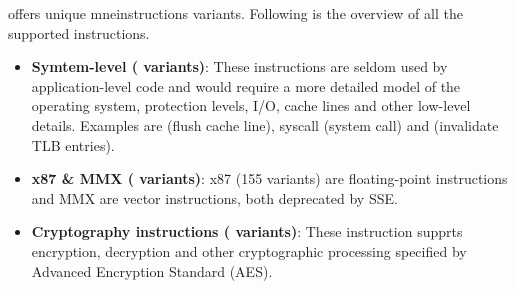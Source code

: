  offers \totalIS{} unique mneinstructions variants.
Following is the overview of all the supported instructions.
\begin{itemize}
    \item \textbf{Symtem-level (\system{} variants)}:  These instructions are seldom
    used by application-level code and would require a more detailed model of
    the operating system, protection levels, I/O, cache lines and other
    low-level details. Examples are  (flush cache line),
     syscall (system call) and
     (invalidate TLB entries).
    
    
    \item \textbf{x87 \& MMX (\Xmmx{} variants)}: x87 (155 variants) are
    floating-point instructions  and MMX are vector instructions,
    both deprecated by SSE.  
    
    \item \textbf{Cryptography instructions (\crypto{} variants)}: These instruction
    supprts encryption, decryption and other  cryptographic processing
    specified by Advanced Encryption Standard (AES). 
\end{itemize}


\label{sec:IC}



